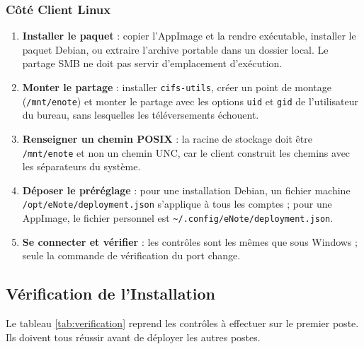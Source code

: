 \subsubsection{Côté Client Linux}
\begin{enumerate}
    \item \textbf{Installer le paquet} : copier l'AppImage et la rendre exécutable, installer le paquet
          Debian, ou extraire l'archive portable dans un dossier local. Le partage SMB ne doit pas
          servir d'emplacement d'exécution.
    \item \textbf{Monter le partage} : installer \texttt{cifs-utils}, créer un point de montage
          (\texttt{/mnt/enote}) et monter le partage avec les options \texttt{uid} et \texttt{gid} de
          l'utilisateur du bureau, sans lesquelles les téléversements échouent.
    \item \textbf{Renseigner un chemin POSIX} : la racine de stockage doit être \texttt{/mnt/enote} et
          non un chemin UNC, car le client construit les chemins avec les séparateurs du système.
    \item \textbf{Déposer le préréglage} : pour une installation Debian, un fichier machine
          \texttt{/opt/eNote/deployment.json} s'applique à tous les comptes ; pour une AppImage, le
          fichier personnel est \texttt{\textasciitilde/.config/eNote/deployment.json}.
    \item \textbf{Se connecter et vérifier} : les contrôles sont les mêmes que sous Windows ; seule la
          commande de vérification du port change.
\end{enumerate}

\subsection{Vérification de l'Installation}
Le tableau \ref{tab:verification} reprend les contrôles à effectuer sur le premier poste. Ils doivent
tous réussir avant de déployer les autres postes.

